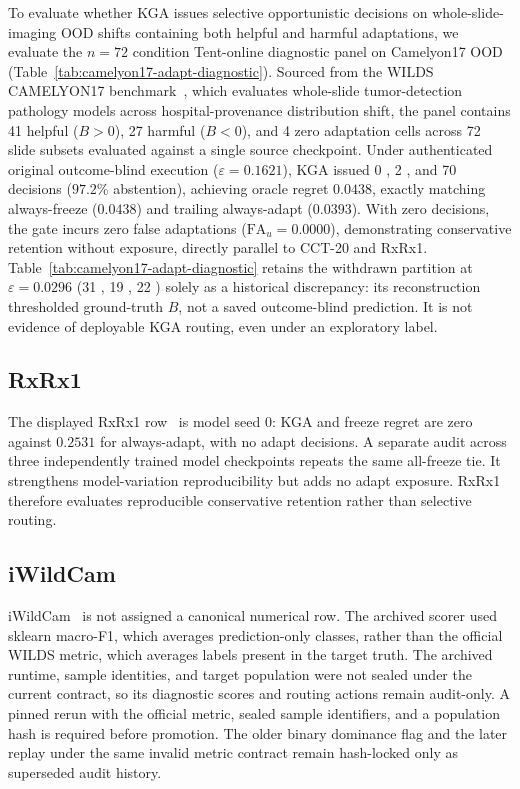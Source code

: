 To evaluate whether KGA issues selective opportunistic \adapt decisions on whole-slide-imaging OOD shifts containing both helpful and harmful adaptations, we evaluate the $n=72$ condition Tent-online diagnostic panel on Camelyon17 OOD (Table~\ref{tab:camelyon17-adapt-diagnostic}). Sourced from the WILDS CAMELYON17 benchmark~\cite{bandi2019camelyon,koh2021wilds}, which evaluates whole-slide tumor-detection pathology models across hospital-provenance distribution shift, the panel contains 41 helpful ($B > 0$), 27 harmful ($B < 0$), and 4 zero adaptation cells across 72 slide subsets evaluated against a single source checkpoint.
Under authenticated original outcome-blind execution ($\varepsilon = 0.1621$), KGA issued 0 \adapt, 2 \freeze, and 70 \abstain decisions ($97.2\%$ abstention), achieving oracle regret $0.0438$, exactly matching always-freeze ($0.0438$) and trailing always-adapt ($0.0393$). With zero \adapt decisions, the gate incurs zero false adaptations ($\mathrm{FA}_u = 0.0000$), demonstrating conservative retention without \adapt exposure, directly parallel to CCT-20 and RxRx1. Table~\ref{tab:camelyon17-adapt-diagnostic} retains the withdrawn partition at $\varepsilon = 0.0296$ (31 \adapt, 19 \freeze, 22 \abstain) solely as a historical discrepancy: its reconstruction thresholded ground-truth $B$, not a saved outcome-blind prediction. It is not evidence of deployable KGA routing, even under an exploratory label.




\subsection{RxRx1}

The displayed RxRx1 row~\cite{taylor2019rxrx1} is model seed 0: KGA and freeze regret are zero against $0.2531$ for
always-adapt, with no adapt decisions. A separate audit across three independently trained model
checkpoints repeats the same all-freeze tie. It strengthens model-variation reproducibility but
adds no adapt exposure. RxRx1 therefore evaluates reproducible conservative retention rather than
selective routing.

\subsection{iWildCam}

iWildCam~\cite{koh2021wilds} is not assigned a canonical numerical row. The archived scorer used sklearn macro-F1,
which averages prediction-only classes, rather than the official WILDS metric, which averages labels
present in the target truth. The archived runtime, sample identities, and target population were not
sealed under the current contract, so its diagnostic scores and routing actions remain audit-only.
A pinned rerun with the official metric, sealed sample identifiers, and a population hash is required
before promotion. The older binary dominance flag and the later replay under the same invalid metric
contract remain hash-locked only as superseded audit history.

